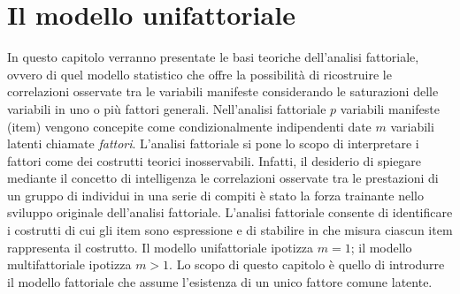 
\chapter{Il modello unifattoriale}
\label{ch:spearman}

In questo capitolo verranno presentate le basi teoriche dell'analisi fattoriale, ovvero di quel modello statistico che offre la possibilità di ricostruire le correlazioni osservate tra le variabili manifeste considerando le saturazioni delle variabili in uno o più fattori generali.
%
Nell'analisi fattoriale $p$ variabili manifeste (item) vengono concepite come condizionalmente indipendenti date $m$ variabili latenti chiamate \emph{fattori}. 
L'analisi fattoriale si pone lo scopo di interpretare i fattori come dei costrutti teorici inosservabili. 
Infatti, il desiderio di spiegare mediante il concetto di intelligenza le correlazioni osservate tra le prestazioni di un gruppo di individui in una serie di compiti è stato la forza trainante nello sviluppo originale dell'analisi fattoriale.
L'analisi fattoriale  consente  di identificare i costrutti di cui gli item  sono espressione e di stabilire in che misura ciascun item rappresenta il costrutto.
Il modello unifattoriale ipotizza $m = 1$; il modello multifattoriale ipotizza $m > 1$.
Lo scopo di questo capitolo è quello di introdurre il modello fattoriale che assume l'esistenza di un unico fattore comune latente. 


